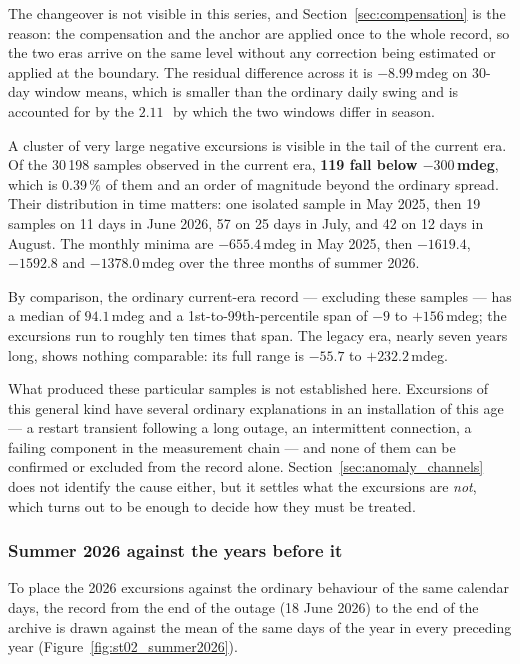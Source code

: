 \documentclass[11pt,a4paper]{article}
\begin{document}
The changeover is not visible in this series, and Section~\ref{sec:compensation} is the reason: the compensation and the anchor are applied once to the whole record, so the two eras arrive on the same level without any correction being estimated or applied at the boundary. The residual difference across it is $-8.99$\,mdeg on 30-day window means, which is smaller than the ordinary daily swing and is accounted for by the $2.11$\,\degC\ by which the two windows differ in season.

A cluster of very large negative excursions is visible in the tail of the current era. Of the 30\,198 samples observed in the current era, \textbf{119 fall below $-300$\,mdeg}, which is 0.39\,\% of them and an order of magnitude beyond the ordinary spread. Their distribution in time matters: one isolated sample in May 2025, then 19 samples on 11 days in June 2026, 57 on 25 days in July, and 42 on 12 days in August. The monthly minima are $-655.4$\,mdeg in May 2025, then $-1619.4$, $-1592.8$ and $-1378.0$\,mdeg over the three months of summer 2026.

By comparison, the ordinary current-era record --- excluding these samples --- has a median of $94.1$\,mdeg and a 1st-to-99th-percentile span of $-9$ to $+156$\,mdeg; the excursions run to roughly ten times that span. The legacy era, nearly seven years long, shows nothing comparable: its full range is $-55.7$ to $+232.2$\,mdeg.

What produced these particular samples is not established here. Excursions of this general kind have several ordinary explanations in an installation of this age --- a restart transient following a long outage, an intermittent connection, a failing component in the measurement chain --- and none of them can be confirmed or excluded from the record alone. Section~\ref{sec:anomaly_channels} does not identify the cause either, but it settles what the excursions are \emph{not}, which turns out to be enough to decide how they must be treated.

\subsubsection*{Summer 2026 against the years before it}

To place the 2026 excursions against the ordinary behaviour of the same calendar days, the record from the end of the outage (18 June 2026) to the end of the archive is drawn against the mean of the same days of the year in every preceding year (Figure~\ref{fig:st02_summer2026}).
\end{document}
